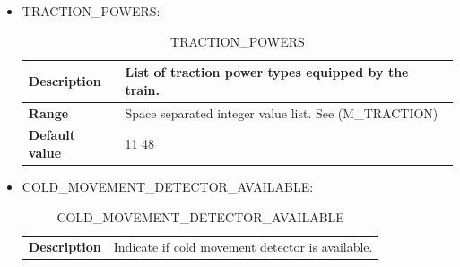 \begin{itemize}
\begin{longtable}{|l|l|}
				\hline

			\end{longtable}

		\item TRACTION\_POWERS:

			\begin{longtable}{|l|l|}
				\caption{TRACTION\_POWERS}\\
				\hline

					\begin{minipage}[t]{0.22\linewidth} \textbf{Description}	\end{minipage}
				&	\begin{minipage}[t]{0.78\linewidth} List of traction power types equipped by the train. \end{minipage} \\

				\hline

					\begin{minipage}[t]{0.22\linewidth} \textbf{Range}	\end{minipage}
				&	\begin{minipage}[t]{0.78\linewidth} Space separated integer value list. See (M\_TRACTION) \end{minipage} \\

				\hline

					\begin{minipage}[t]{0.22\linewidth} \textbf{Default value}	\end{minipage}
				&	\begin{minipage}[t]{0.78\linewidth} 11 48 \end{minipage} \\

				\hline

			\end{longtable}

		\item COLD\_MOVEMENT\_DETECTOR\_AVAILABLE:

			\begin{longtable}{|l|l|}
				\caption{COLD\_MOVEMENT\_DETECTOR\_AVAILABLE}\\
				\hline

					\begin{minipage}[t]{0.22\linewidth} \textbf{Description}	\end{minipage}
				&	\begin{minipage}[t]{0.78\linewidth} Indicate if cold movement detector is available. \end{minipage} \\


\end{longtable}
\end{itemize}
